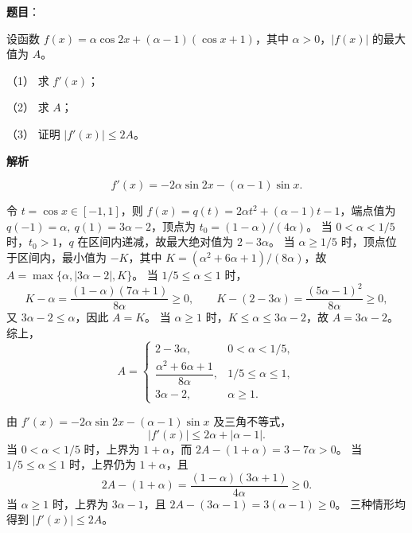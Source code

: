 \begin{answer}

\textbf{题目}：

设函数 \(f(x)=\alpha\cos2x+(\alpha-1)(\cos x+1)\)，其中 \(\alpha>0\)，\(|f(x)|\) 的最大值为 \(A\)。

（1） 求 \(f'(x)\)；

（2） 求 \(A\)；

（3） 证明 \(|f'(x)|\leq2A\)。

\textbf{解析}


\nopagebreak[4]
\[
f'(x)=-2\alpha\sin2x-(\alpha-1)\sin x.
\]


令 \(t=\cos x\in[-1,1]\)，则 \(f(x)=q(t)=2\alpha t^2+(\alpha-1)t-1\)，端点值为 \(q(-1)=\alpha,\ q(1)=3\alpha-2\)，顶点为 \(t_0=(1-\alpha)/(4\alpha)\)。
当 \(0<\alpha<1/5\) 时，\(t_0>1\)，\(q\) 在区间内递减，故最大绝对值为 \(2-3\alpha\)。
当 \(\alpha\geq1/5\) 时，顶点位于区间内，最小值为 \(-K\)，其中 \(K=(\alpha^2+6\alpha+1)/(8\alpha)\)，故 \(A=\max\{\alpha,|3\alpha-2|,K\}\)。
当 \(1/5\leq\alpha\leq1\) 时，
\nopagebreak[4]
\[
K-\alpha=\frac{(1-\alpha)(7\alpha+1)}{8\alpha}\geq0,\qquad
K-(2-3\alpha)=\frac{(5\alpha-1)^2}{8\alpha}\geq0,
\]
又 \(3\alpha-2\leq\alpha\)，因此 \(A=K\)。
当 \(\alpha\geq1\) 时，\(K\leq\alpha\leq3\alpha-2\)，故 \(A=3\alpha-2\)。综上，
\nopagebreak[4]
\[
A=\begin{cases}
2-3\alpha,&0<\alpha<1/5,\\
\dfrac{\alpha^2+6\alpha+1}{8\alpha},&1/5\leq\alpha\leq1,\\
3\alpha-2,&\alpha\geq1.
\end{cases}
\]


由 \(f'(x)=-2\alpha\sin2x-(\alpha-1)\sin x\) 及三角不等式，
\nopagebreak[4]
\[
|f'(x)|\leq2\alpha+|\alpha-1|.
\]
当 \(0<\alpha<1/5\) 时，上界为 \(1+\alpha\)，而
\(2A-(1+\alpha)=3-7\alpha>0\)。
当 \(1/5\leq\alpha\leq1\) 时，上界仍为 \(1+\alpha\)，且
\nopagebreak[4]
\[
2A-(1+\alpha)=\frac{(1-\alpha)(3\alpha+1)}{4\alpha}\geq0.
\]
当 \(\alpha\geq1\) 时，上界为 \(3\alpha-1\)，且
\(2A-(3\alpha-1)=3(\alpha-1)\geq0\)。
三种情形均得到 \(|f'(x)|\leq2A\)。




\end{answer}
